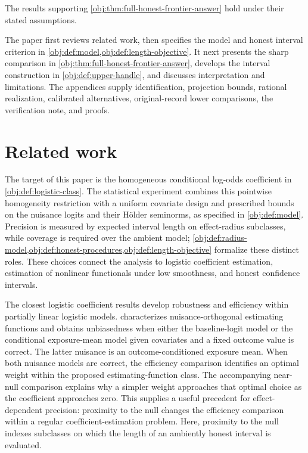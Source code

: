 \documentclass[11pt]{article}
\begin{document}
The results supporting \cref{obj:thm:full-honest-frontier-answer} hold under their stated assumptions.

The paper first reviews related work, then specifies the model and honest interval criterion in \cref{obj:def:model,obj:def:length-objective}. It next presents the sharp comparison in \cref{obj:thm:full-honest-frontier-answer}, develops the interval construction in \cref{obj:def:upper-handle}, and discusses interpretation and limitations. The appendices supply identification, projection bounds, rational realization, calibrated alternatives, original-record lower comparisons, the verification note, and proofs.


\section{Related work}

The target of this paper is the homogeneous conditional log-odds coefficient  in \cref{obj:def:logistic-class}. The statistical experiment combines this pointwise homogeneity restriction with a uniform covariate design and prescribed bounds on the nuisance logits and their Hölder seminorms, as specified in \cref{obj:def:model}. Precision is measured by expected interval length on effect-radius subclasses, while coverage is required over the ambient model; \cref{obj:def:radius-model,obj:def:honest-procedures,obj:def:length-objective} formalize these distinct roles. These choices connect the analysis to logistic coefficient estimation, estimation of nonlinear functionals under low smoothness, and honest confidence intervals.

The closest logistic coefficient results develop robustness and efficiency within partially linear logistic models. \citet[Propositions 1--3]{Tan2019LogisticDR} characterizes nuisance-orthogonal estimating functions and obtains unbiasedness when either the baseline-logit model or the conditional exposure-mean model given covariates and a fixed outcome value is correct. The latter nuisance is an outcome-conditioned exposure mean. When both nuisance models are correct, the efficiency comparison identifies an optimal weight within the proposed estimating-function class. The accompanying near-null comparison explains why a simpler weight approaches that optimal choice as the coefficient approaches zero. This supplies a useful precedent for effect-dependent precision: proximity to the null changes the efficiency comparison within a regular coefficient-estimation problem. Here, proximity to the null indexes subclasses on which the length of an ambiently honest interval is evaluated.
\end{document}
